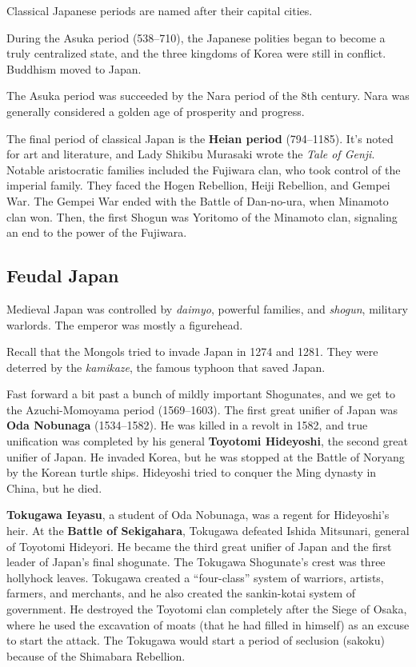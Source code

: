 Classical Japanese periods are named after their capital cities.

During the Asuka period (538--710), the Japanese polities began to become a truly centralized state,
and the three kingdoms of Korea were still in conflict.
Buddhism moved to Japan.

The Asuka period was succeeded by the Nara period of the 8th century.
Nara was generally considered a golden age of prosperity and progress.

The final period of classical Japan is the \textbf{Heian period} (794--1185).
It's noted for art and literature, and Lady Shikibu Murasaki wrote the \textit{Tale of Genji}.
Notable aristocratic families included the Fujiwara clan, who took control of the imperial family.
They faced the Hogen Rebellion, Heiji Rebellion, and Gempei War.
The Gempei War ended with the Battle of Dan-no-ura, when Minamoto clan won.
Then, the first Shogun was Yoritomo of the Minamoto clan, signaling an end to the power of the Fujiwara.

\subsection*{Feudal Japan}

Medieval Japan was controlled by \textit{daimyo}, powerful families, and \textit{shogun}, military warlords.
The emperor was mostly a figurehead.

Recall that the Mongols tried to invade Japan in 1274 and 1281.
They were deterred by the \textit{kamikaze}, the famous typhoon that saved Japan.

Fast forward a bit past a bunch of mildly important Shogunates,
and we get to the Azuchi-Momoyama period (1569--1603).
The first great unifier of Japan was \textbf{Oda Nobunaga} (1534--1582).
He was killed in a revolt in 1582,
and true unification was completed by his general \textbf{Toyotomi Hideyoshi},
the second great unifier of Japan.
He invaded Korea, but he was stopped at the Battle of Noryang by the Korean turtle ships.
Hideyoshi tried to conquer the Ming dynasty in China, but he died.

\textbf{Tokugawa Ieyasu}, a student of Oda Nobunaga, was a regent for Hideyoshi's heir.
At the \textbf{Battle of Sekigahara}, Tokugawa defeated Ishida Mitsunari, general of Toyotomi Hideyori.
He became the third great unifier of Japan and the first leader of Japan's final shogunate.
The Tokugawa Shogunate's crest was three hollyhock leaves.
Tokugawa created a ``four-class'' system of warriors, artists, farmers, and merchants,
and he also created the sankin-kotai system of government.
He destroyed the Toyotomi clan completely after the Siege of Osaka,
where he used the excavation of moats (that he had filled in himself) as an excuse to start the attack.
The Tokugawa would start a period of seclusion (sakoku) because of the Shimabara Rebellion.

